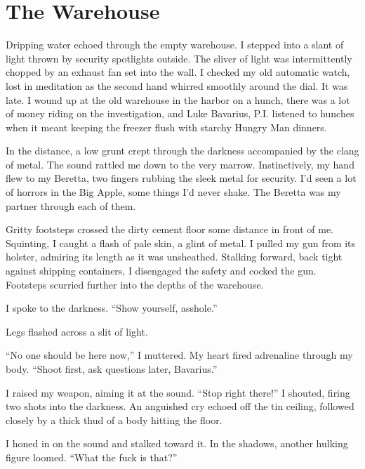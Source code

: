 \chapter{The Warehouse}


Dripping water echoed through the empty warehouse. I stepped into a
slant of light thrown by security spotlights outside. The sliver of
light was intermittently chopped by an exhaust fan set into the
wall. I checked my old automatic watch, lost in meditation as the
second hand whirred smoothly around the dial. It was late. I wound
up at the old warehouse in the harbor on a hunch, there was a lot
of money riding on the investigation, and Luke Bavarius, P.I.
listened to hunches when it meant keeping the freezer flush with
starchy Hungry Man dinners.



In the distance, a low grunt crept through the darkness accompanied
by the clang of metal. The sound rattled me down to the very
marrow. Instinctively, my hand flew to my Beretta, two fingers
rubbing the sleek metal for security. I'd seen a lot of horrors in
the Big Apple, some things I'd never shake. The Beretta was my
partner through each of them.



Gritty footsteps crossed the dirty cement floor some distance in
front of me. Squinting, I caught a flash of pale skin, a glint of
metal. I pulled my gun from its holster, admiring its length as it
was unsheathed. Stalking forward, back tight against shipping
containers, I disengaged the safety and cocked the gun. Footsteps
scurried further into the depths of the warehouse.



I spoke to the darkness. ``Show yourself,
asshole.''



Legs flashed across a slit of light.



``No one should be here now,'' I muttered. My heart fired
adrenaline through my body. ``Shoot first, ask questions
later, Bavarius.''



I raised my weapon, aiming it at the sound. ``Stop right
there!'' I shouted, firing two shots into the darkness. An
anguished cry echoed off the tin ceiling, followed closely by a
thick thud of a body hitting the floor.



I honed in on the sound and stalked toward it. In the shadows,
another hulking figure loomed. ``What the fuck is
that?''



